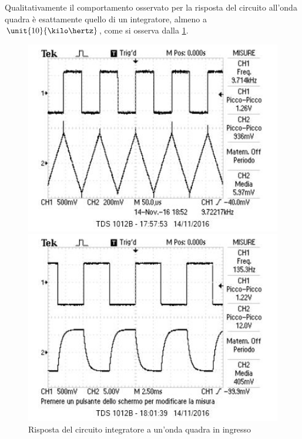 \documentclass[10pt,a4paper]{article}
\begin{document}
Qualitativamente il comportamento osservato per la risposta del circuito all'onda quadra è esattamente quello di un integratore, almeno a $\unit{10}{\kilo\hertz}$, come si osserva dalla \figurename{\ref{fig:intsq}}.

\begin{figure}[h!]
	\begin{minipage}[t]{0.45\textwidth}
		\centering
		\includegraphics[width=1\textwidth]{../oscilloscopio/sqint.jpg}
	\end{minipage}
	\begin{minipage}[t]{0.45\textwidth}
		\centering
		\includegraphics[width=1\textwidth]{../oscilloscopio/sqexp.jpg}
	\end{minipage}
	\caption{Risposta del circuito integratore a un'onda quadra in ingresso}
	\label{fig:intsq}
\end{figure}
\end{document}
